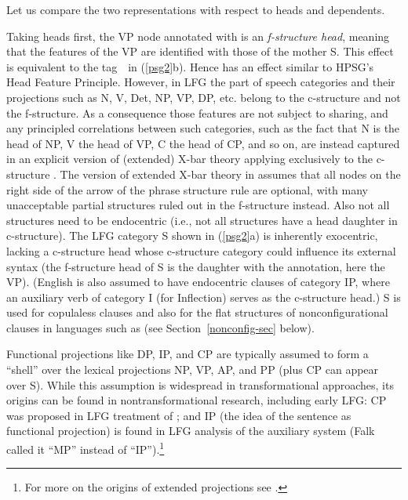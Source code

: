 \noindent
Let us compare the two representations with respect to heads and dependents.

Taking heads first, the VP node annotated with \updown{} is an \textit{f-structure head}, meaning that the features of the VP are identified with those of the mother S.  This effect is equivalent to the tag\ \ in (\ref{psg2}b).    Hence  \updown{} has an effect similar to HPSG's Head Feature Principle.  However, in LFG the part of speech categories and their projections such as N, V, Det, NP, VP, DP, etc. belong to the c-structure and not the f-structure.  As a consequence those features are not subject to sharing, and any principled correlations between such categories, such as the fact that N is the head of NP, V the head of VP, C the head of CP, and so on, are instead captured in an explicit version of (extended) X-bar theory applying exclusively to the c-structure \citep{grimshaw98}.  The version of extended X-bar theory in \citet[Chapter 6]{BATW2016a} assumes that all nodes on the right side of the arrow of the phrase structure rule are optional, with many unacceptable partial structures ruled out in the f-structure instead.  Also not all structures need to be endocentric (i.e., not all structures have a head daughter in c-structure).  The LFG category S shown in (\ref{psg2}a) is inherently exocentric, lacking a  c-structure head whose c-structure category could influence its external syntax (the f-structure head of S is the daughter with the \updown{} annotation, here the VP).   (English is also assumed to have endocentric clauses of category IP, where an auxiliary verb of category I (for Inflection) serves as the c-structure head.)  S is used for copulaless clauses and also for the flat structures of nonconfigurational clauses in languages such as  (see Section~\ref{nonconfig-sec} below).   

Functional projections like DP, IP, and CP are typically assumed to form a ``shell'' over the lexical projections NP, VP, AP, and PP (plus CP can appear over S).  While this assumption is widespread in transformational approaches, its origins can be found in nontransformational  research, including early LFG:  CP was proposed in  LFG treatment of ; and IP (the idea of the sentence as functional projection) is found in  LFG analysis of the  auxiliary system (Falk called it ``MP'' instead of ``IP'').\footnote{For more on the origins of extended projections see \citet[124--5]{BATW2016a}.}  

